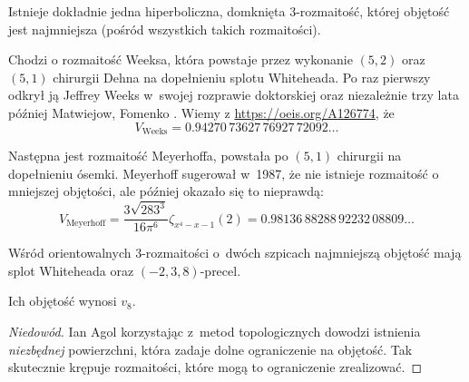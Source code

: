 \begin{proposition}
    Istnieje dokładnie jedna hiperboliczna, domknięta 3-rozmaitość, której objętość jest najmniejsza (pośród wszystkich takich rozmaitości).
\end{proposition}

Chodzi o rozmaitość Weeksa, która powstaje przez wykonanie $(5, 2)$ oraz $(5, 1)$ chirurgii Dehna na dopełnieniu splotu Whiteheada.
%
%
%
Po raz pierwszy odkrył ją Jeffrey Weeks \cite{weeks1985} w~swojej rozprawie doktorskiej oraz niezależnie trzy lata później Matwiejow, Fomenko \cite{fomenko1988}.
%
%
%
Wiemy z \url{https://oeis.org/A126774}, że
\begin{equation}
    V_{\textrm{Weeks}} = 0.94270 \, 73627 \, 76927 \, 72092 \ldots
\end{equation}

Następna jest rozmaitość Meyerhoffa, powstała po $(5, 1)$ chirurgii na dopełnieniu ósemki.
%
Meyerhoff sugerował w~1987, że nie istnieje rozmaitość o mniejszej objętości, ale później okazało się to nieprawdą: 
\begin{equation}
    V_{\textrm{Meyerhoff}} = \frac{ 3 \sqrt{283^3} } {16 \pi^6} \zeta_{x^4-x-1}(2) = 0.98136 \, 88288 \, 92232 \, 08809 \ldots
\end{equation}

\begin{proposition}
    Wśród orientowalnych 3-rozmaitości o~dwóch szpicach najmniejszą objętość mają splot Whiteheada oraz $(-2, 3, 8)$-precel.
%
%
%
\end{proposition}


Ich objętość wynosi $v_8$.

\begin{proof}[Niedowód]
%
    Ian Agol \cite{agol2010} korzystając z~metod topologicznych dowodzi istnienia \emph{niezbędnej} powierzchni, która zadaje dolne ograniczenie na objętość.
    Tak skutecznie krępuje rozmaitości, które mogą to ograniczenie zrealizować.
\end{proof}

